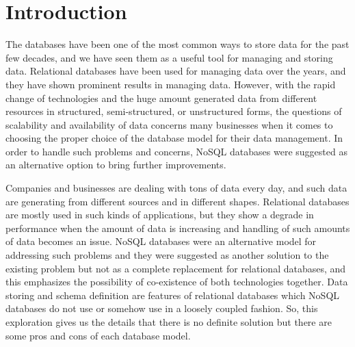 \documentclass[sigconf,nonacm]{acmart}
\begin{document}



\maketitle

\section{Introduction}
The databases have been one of the most common ways to store data for the past few decades, and we have seen them as a useful tool for managing and storing data. Relational databases have been used for managing data over the years, and they have shown prominent results in managing data\cite{1}. However, with the rapid change of technologies and the huge amount generated data from different resources in structured, semi-structured, or unstructured forms, the questions of scalability and availability of data concerns many businesses when it comes to choosing the proper choice of the database model for their data management. In order to handle such problems and concerns, NoSQL databases were suggested as an alternative option to bring further improvements\cite{1}.  


Companies and businesses are dealing with tons of data every day, and such data are generating from different sources and in different shapes. Relational databases are mostly used in such kinds of applications, but they show a degrade in performance when the amount of data is increasing and handling of such amounts of data becomes an issue\cite{1}\cite{2}. NoSQL databases were an alternative model for addressing such problems and they were suggested as another solution to the existing problem but not as a complete replacement for relational databases, and this emphasizes the possibility of co-existence of both technologies together\cite{1}. Data storing and schema definition are features of relational databases which NoSQL databases do not use or somehow use in a loosely coupled fashion. So, this exploration gives us the details that there is no definite solution but there are some pros and cons of each database model.
\end{document}

